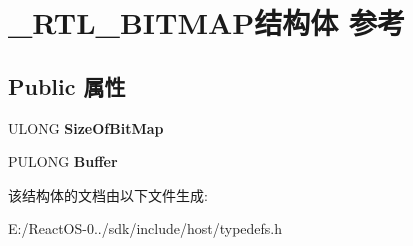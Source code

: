 \hypertarget{struct___r_t_l___b_i_t_m_a_p}{}\section{\+\_\+\+R\+T\+L\+\_\+\+B\+I\+T\+M\+A\+P结构体 参考}
\label{struct___r_t_l___b_i_t_m_a_p}
\subsection*{Public 属性}
\begin{DoxyCompactItemize}
\item 
\mbox{\label{struct___r_t_l___b_i_t_m_a_p_a55ce30e5936e80d192378bab25bcc4f2}} 
U\+L\+O\+NG {\bfseries Size\+Of\+Bit\+Map}
\item 
\mbox{\label{struct___r_t_l___b_i_t_m_a_p_ac524f222b86439c023ea0b3b87edab27}} 
P\+U\+L\+O\+NG {\bfseries Buffer}
\end{DoxyCompactItemize}


该结构体的文档由以下文件生成\+:\begin{DoxyCompactItemize}
\item 
E\+:/\+React\+O\+S-\/0../sdk/include/host/typedefs.\+h\end{DoxyCompactItemize}
